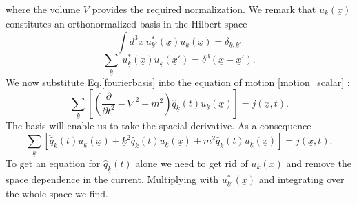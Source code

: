 \documentclass[12pt, titlepage]{article}
\begin{document}
where the volume $ V $ provides the required normalization. We remark that $ u_{\underline{k}}(\underline{x}) $ constitutes an orthonormalized basis in the Hilbert space
\begin{equation}\label{ortho_relation}
\int d^{3}x \ 
u^{\ast}_{\underline{k}'}(\underline{x})
u_{\underline{k}}(\underline{x})
=
\delta_{\underline{k}, \underline{k}'}
\end{equation}
\begin{equation}\label{completness_relation}
\sum_{\underline{k}} \ 
u^{\ast}_{\underline{k}}(\underline{x})
u_{\underline{k}}(\underline{x}')
=
\delta^{3}\left(\underline{x}-\underline{x}'\right)
.
\end{equation}
We now substitute Eq.\eqref{fourierbasis} into the equation of motion \eqref{motion_scalar}
:
\begin{equation}
 \sum_{\underline{k}}
 \left[ 
	\left( 
	\dfrac{\partial}{\partial t^{2}}
	-\nabla^{2}
	+m^{2}
	\right)  
	\hat{q}_{\underline{k}}(t)u_{\underline{k}}(\underline{x})
 \right] 
 =j(\underline{x},t).
\end{equation}
The basis will enable us to take the spacial derivative. As a consequence  
\begin{equation}
 \sum_{\underline{k}}
 \left[ 
	\ddot{\hat{q}}_{\underline{k}}(t)u_{\underline{k}}(\underline{x})
	+\underline{k}^{2}\hat{q}_{\underline{k}}(t)u_{\underline{k}}(\underline{x})
	+m^{2}\hat{q}_{\underline{k}}(t)u_{\underline{k}}(\underline{x})
 \right] 
  =j(\underline{x},t).
\end{equation}
To get an equation for $ \hat{q}_{\underline{k}}(t) $ alone we need to get rid of $ u_{\underline{k}}(\underline{x}) $ and remove the space dependence in the current. Multiplying with $ u^{\ast}_{\underline{k}'}(\underline{x}) $ and integrating over the whole space we find.
\end{document}
